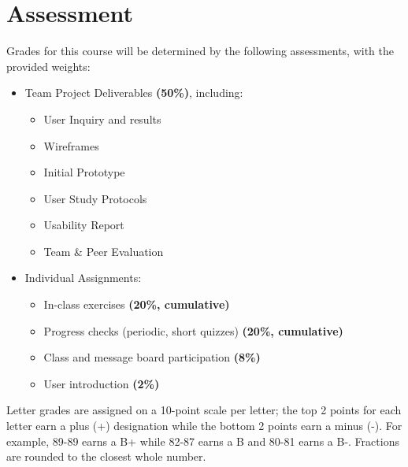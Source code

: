 \documentclass[12pt]{article}
\begin{document}
  \section*{Assessment}
  \noindent
  Grades for this course will be determined by the following assessments, with the provided weights:
  \begin{itemize}
    \item Team Project Deliverables \textbf{(50\%)}, including:\hfill
      \begin{itemize}
        \item User Inquiry and results 
        \item Wireframes
        \item Initial Prototype
        \item User Study Protocols
        \item Usability Report
        \item Team \& Peer Evaluation
      \end{itemize}
    \item Individual Assignments:\hfill
      \begin{itemize}
        \item In-class exercises \textbf{(20\%, cumulative)}
        \item Progress checks (periodic, short quizzes) \textbf{(20\%, cumulative)}
        \item Class and message board participation \textbf{(8\%)}
        \item User introduction \textbf{(2\%)}
      \end{itemize}
  \end{itemize}

  Letter grades are assigned on a 10-point scale per letter; the top 2 points for each letter earn a plus (+) designation while the bottom 2 points earn a minus (-). For example, 89-89 earns a B+ while 82-87 earns a B and 80-81 earns a B-. Fractions are rounded to the closest whole number.
  
\end{document}
